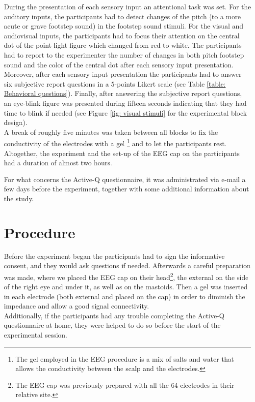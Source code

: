 During the presentation of each sensory input an attentional task was set. For the auditory inputs, the participants had to detect changes of the pitch (to a more acute or grave footstep sound) in the footstep sound stimuli. For the visual and audiovisual inputs, the participants had to focus their attention on the central dot of the point-light-figure which changed from red to white. The participants had to report to the experimenter the number of changes in both pitch footstep sound and the color of the central dot after each sensory input presentation.  \\
Moreover, after each sensory input presentation the participants had to answer six subjective report questions in a 5-points Likert scale (see Table \ref{table: Behavioral questions}). Finally, after answering the subjective report questions, an eye-blink figure was presented during fifteen seconds indicating that they had time to blink if needed (see Figure \ref{fig: visual stimuli} for the experimental block design).  \\
A break of roughly five minutes was taken between all blocks to fix the conductivity of the electrodes with a gel \footnote{The gel employed in the EEG procedure is a mix of salts and water that allows the conductivity between the scalp and the electrodes.} and to let the participants rest. Altogether, the experiment and the set-up of the EEG cap on the participants had a duration of almost two hours.

For what concerns the Active-Q questionnaire, it was administrated via e-mail a few days before the experiment, together with some additional information about the study.

\section{Procedure}
Before the experiment began the participants had to sign the informative consent, and they would ask questions if needed. Afterwards a careful preparation was made, where we placed the EEG cap on their head\footnote{The EEG cap was previously prepared with all the 64 electrodes in their relative site.}, the external on the side of the right eye and under it, as well as on the mastoids. Then a gel was inserted in each electrode (both external and placed on the cap) in order to diminish the impedance and allow a good signal connectivity. \\
Additionally, if the participants had any trouble completing the Active-Q questionnaire at home, they were helped to do so before the start of the experimental session. 


